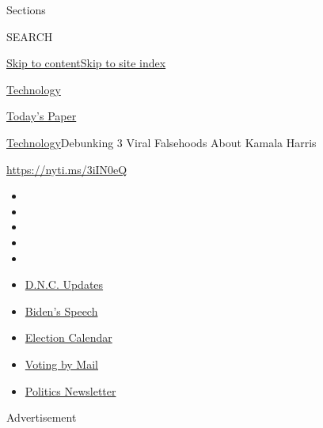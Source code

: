 Sections

SEARCH

\protect\hyperlink{site-content}{Skip to
content}\protect\hyperlink{site-index}{Skip to site index}

\href{https://www.nytimes3xbfgragh.onion/section/technology}{Technology}

\href{https://myaccount.nytimes3xbfgragh.onion/auth/login?response_type=cookie\&client_id=vi}{}

\href{https://www.nytimes3xbfgragh.onion/section/todayspaper}{Today's
Paper}

\href{/section/technology}{Technology}\textbar{}Debunking 3 Viral
Falsehoods About Kamala Harris

\url{https://nyti.ms/3iIN0eQ}

\begin{itemize}
\item
\item
\item
\item
\item
\end{itemize}

\begin{itemize}
\item
  \href{https://www.nytimes3xbfgragh.onion/live/2020/08/20/us/dnc-convention-election?action=click\&pgtype=Article\&state=default\&region=TOP_BANNER\&context=storylines_menu}{D.N.C.
  Updates}
\item
  \href{https://www.nytimes3xbfgragh.onion/2020/08/20/us/politics/biden-presidential-nomination-dnc.html?action=click\&pgtype=Article\&state=default\&region=TOP_BANNER\&context=storylines_menu}{Biden's
  Speech}
\item
  \href{https://www.nytimes3xbfgragh.onion/interactive/2019/us/elections/2020-presidential-election-calendar.html?action=click\&pgtype=Article\&state=default\&region=TOP_BANNER\&context=storylines_menu}{Election
  Calendar}
\item
  \href{https://www.nytimes3xbfgragh.onion/interactive/2020/08/11/us/politics/vote-by-mail-us-states.html?action=click\&pgtype=Article\&state=default\&region=TOP_BANNER\&context=storylines_menu}{Voting
  by Mail}
\item
  \href{https://www.nytimes3xbfgragh.onion/newsletters/politics?action=click\&pgtype=Article\&state=default\&region=TOP_BANNER\&context=storylines_menu}{Politics
  Newsletter}
\end{itemize}

Advertisement

